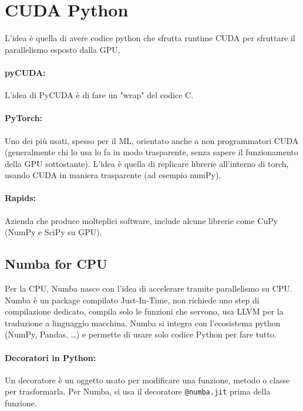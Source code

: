 
\section{CUDA Python}

L'idea è quella di avere codice python che sfrutta runtime CUDA per sfruttare il parallelismo esposto dalla GPU.\\

\paragraph{pyCUDA:} L'idea di PyCUDA è di fare un "wrap" del codice C.\\

\paragraph{PyTorch:} Uno dei più usati, spesso per il ML, orientato anche a non programmatori CUDA (generalmente chi lo usa lo fa in modo trasparente, senza sapere il funzionamento della GPU sottostante). L'idea è quella di replicare librerie all'interno di torch, usando CUDA in maniera trasparente (ad esempio numPy).\\

\paragraph{Rapids:} Azienda che produce molteplici software, include alcune librerie come CuPy (NumPy e SciPy su GPU). \\

\subsection{Numba for CPU}

Per la CPU, Numba nasce con l'idea di accelerare tramite parallelismo su CPU.  Numba è un package compilato Just-In-Time, non richiede uno step di compilazione dedicato, compila solo le funzioni che servono, usa LLVM per la traduzione a linguaggio macchina. Numba si integra con l'ecosistema python (NumPy, Pandas, \dots) e permette di usare solo codice Python per fare tutto.\\

\paragraph{Decoratori in Python:} Un decoratore è un oggetto usato per modificare una funzione, metodo o classe per trasformarla. Per Numba, si usa il decoratore \texttt{@numba.jit} prima della funzione. \\

